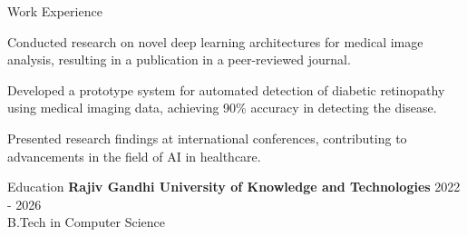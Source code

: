 \documentclass{resume} %
\begin{document}
\begin{rSection}{Work Experience}
\begin{rSubsection}
                                {}
                                    \item Conducted research on novel deep learning architectures for medical image analysis, resulting in a publication in a peer-reviewed journal.
                                    \item Developed a prototype system for automated detection of diabetic retinopathy using medical imaging data, achieving 90\% accuracy in detecting the disease.
                                    \item Presented research findings at international conferences, contributing to advancements in the field of AI in healthcare.
                            \end{rSubsection}
            \end{rSection}

\begin{rSection}{Education}
                        \textbf{Rajiv Gandhi University of Knowledge and Technologies} \hfill {2022 - 2026} \\
                            {B.Tech in Computer Science}
                         
             
         
    \end{rSection}
\end{document}
